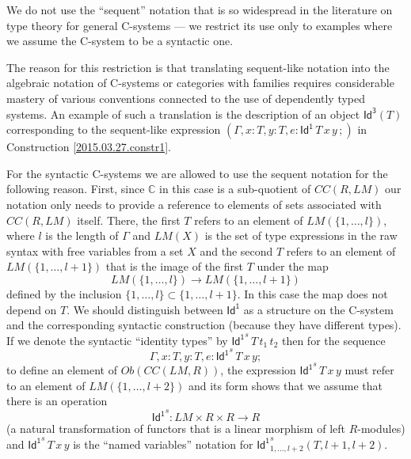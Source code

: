 \documentclass[12pt]{article}
\numberwithin{equation}{section}
\newcommand{\sr}{\rightarrow}
\newcommand{\toCC}{CC} %
\newcommand{\aCC}{{\mathbb C}}  %
\newcommand{\p}{\mathsf{p}}
\newcommand{\Id}{\mathsf{Id^1}} %
\newcommand{\Idx}{\mathsf{Id^3}} %
\begin{document}
We do not use the ``sequent'' notation that is so widespread in the literature
on type theory for general C-systems --- we restrict its use only to examples where
we assume the C-system to be a syntactic one.

The reason for this restriction is that translating sequent-like notation
into the algebraic notation of C-systems or categories with families requires
considerable mastery of various conventions connected to the use of dependently
typed systems. An example of such a translation is the description of an object
$\Idx(T)$ corresponding to the sequent-like expression
$(\Gamma, x:T, y:T, e:\Id\, T\, x\, y\,;)$ in Construction \ref{2015.03.27.constr1}.


For the syntactic C-systems we are allowed to use the sequent notation for the
following reason. First, since $\aCC$ in this case is a sub-quotient of
$\toCC(R,LM)$ our notation only needs to provide a reference to elements of sets
associated with $\toCC(R,LM)$ itself.  There, the first $T$ refers to an element
of $LM(\{1,\dots,l\})$, where $l$ is the length of $\Gamma$ and $LM(X)$ is the
set of type expressions in the raw syntax with free variables from a set $X$
and the second $T$ refers to an element of $LM(\{1,\dots,l+1\})$ that is the
image of the first $T$ under the map
%
$$LM(\{1,\dots,l\})\sr LM(\{1,\dots,l+1\})$$
%
defined by the inclusion $\{1,\dots,l\}\subset \{1,\dots,l+1\}$. In this case
the map does not depend on $T$. We should distinguish between $\Id$ as a
structure on the C-system and the corresponding syntactic construction (because
they have different types). If we denote the syntactic ``identity types'' by
$\Id^s\, T\, t_1\, t_2$ then for the sequence
%
$$\Gamma, x:T, y:T, e:\Id^s\,T\,x\,y;$$
%
to define an element of $Ob(\toCC(LM,R))$, the expression $\Id^s\,T\,x\,y$ must
refer to an element of $LM(\{1,\dots,l+2\})$ and its form shows that we assume
that there is an operation
%
$$\Id^s:LM\times R\times R\sr R$$
%
(a natural transformation of functors that is a linear morphism of left
$R$-modules) and $\Id^s\,T\,x\,y$ is the ``named variables'' notation for
$\Id^s_{{1,\dots,l+2}}(T,l+1,l+2)$.
\end{document}
